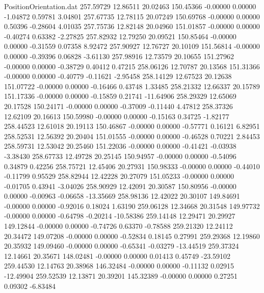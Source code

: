 \begin{filecontents}{PositionOrientation.dat}
 257.59729   12.86511   20.02463   150.45366   -0.00000    0.00000   -1.04872    0.59781    3.04801
 257.67735   12.78115   20.07249   150.69768   -0.00000    0.00000    0.50396   -0.28604    4.01035
 257.75736   12.82148   20.04960   151.01857   -0.00000    0.00000   -0.40274    0.63382   -2.27825
 257.82932   12.79250   20.09521   150.85464   -0.00000    0.00000   -0.31559    0.07358    8.92472
 257.90927   12.76727   20.10109   151.56814   -0.00000    0.00000   -0.39396    0.06828   -3.61130
 257.98916   12.73579   20.10655   151.27962   -0.00000    0.00000   -0.38729    0.40412    0.47215
 258.06126   12.70787   20.13568   151.31366   -0.00000    0.00000   -0.40779   -0.11621   -2.95458
 258.14129   12.67523   20.12638   151.07722   -0.00000    0.00000   -0.16466    0.43748    1.33485
 258.21332   12.66337   20.15789   151.17336   -0.00000    0.00000   -0.15859    0.21741  -11.64906
 258.29329   12.65069   20.17528   150.24171   -0.00000    0.00000   -0.37009   -0.11440    4.47812
 258.37326   12.62109   20.16613   150.59980   -0.00000    0.00000   -0.15163    0.34725   -1.82177
 258.44523   12.61018   20.19113   150.46867   -0.00000    0.00000   -0.57771    0.16121    6.82951
 258.52531   12.56392   20.20404   151.01555   -0.00000    0.00000   -0.46528    0.70221    2.84453
 258.59731   12.53042   20.25460   151.22036   -0.00000    0.00000   -0.41421   -0.03938   -3.38430
 258.67733   12.49728   20.25145   150.94957   -0.00000    0.00000   -0.54096    0.34879    0.42256
 258.75721   12.45406   20.27931   150.98333   -0.00000    0.00000   -0.44010   -0.11799    0.95529
 258.82944   12.42228   20.27079   151.05233   -0.00000    0.00000   -0.01705    0.43941   -3.04026
 258.90929   12.42091   20.30587   150.80956   -0.00000    0.00000   -0.00963   -0.06658  -13.35669
 258.98136   12.42022   20.30107   149.84691   -0.00000    0.00000   -0.92016    0.18024    1.63190
 259.06128   12.34668   20.31548   149.97732   -0.00000    0.00000   -0.64798   -0.20214  -10.58386
 259.14148   12.29471   20.29927   149.12844   -0.00000    0.00000   -0.74726    0.63370   -0.78588
 259.21320   12.24112   20.34472   149.07208   -0.00000    0.00000   -0.52834    0.18145    0.27991
 259.29368   12.19860   20.35932   149.09460   -0.00000    0.00000   -0.65341   -0.03279  -13.44519
 259.37324   12.14661   20.35671   148.02481   -0.00000    0.00000    0.01413    0.45749  -23.59102
 259.44530   12.14763   20.38968   146.32484   -0.00000    0.00000   -0.11132    0.02915  -12.49904
 259.52539   12.13871   20.39201   145.32389   -0.00000    0.00000    0.27251    0.09302   -6.83484

\end{filecontents}
